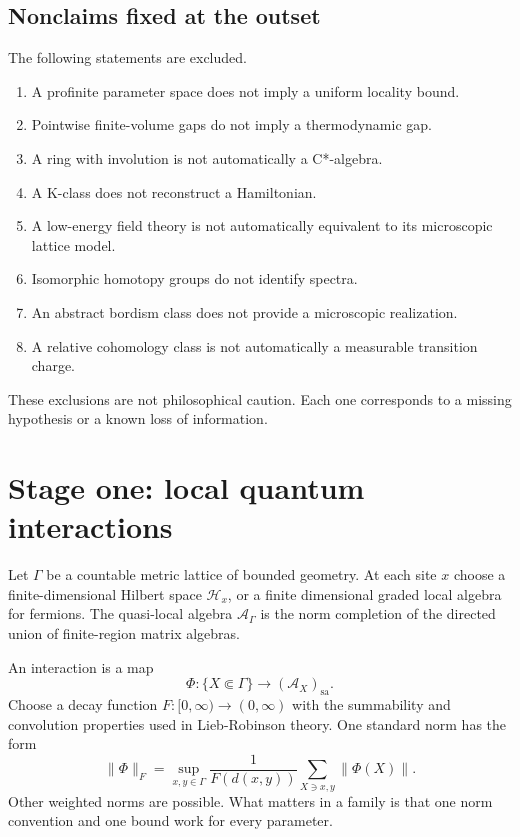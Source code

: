 \documentclass[12pt]{article}
\theoremstyle{definition}
\theoremstyle{remark}
\newcommand{\A}{\mathcal A}
\begin{document}
\subsection{Nonclaims fixed at the outset}

The following statements are excluded.
\begin{enumerate}[leftmargin=2.2em]
  \item A profinite parameter space does not imply a uniform locality bound.
  \item Pointwise finite-volume gaps do not imply a thermodynamic gap.
  \item A ring with involution is not automatically a C*-algebra.
  \item A K-class does not reconstruct a Hamiltonian.
  \item A low-energy field theory is not automatically equivalent to its
  microscopic lattice model.
  \item Isomorphic homotopy groups do not identify spectra.
  \item An abstract bordism class does not provide a microscopic realization.
  \item A relative cohomology class is not automatically a measurable
  transition charge.
\end{enumerate}

These exclusions are not philosophical caution.  Each one corresponds to a
missing hypothesis or a known loss of information.

\section{Stage one: local quantum interactions}

Let $\Gamma$ be a countable metric lattice of bounded geometry.  At each site
$x$ choose a finite-dimensional Hilbert space $\mathcal H_x$, or a finite
dimensional graded local algebra for fermions.  The quasi-local algebra
$\A_\Gamma$ is the norm completion of the directed union of finite-region
matrix algebras.

An interaction is a map
\begin{equation}
\Phi:\{X\Subset\Gamma\}\longrightarrow(\A_X)_{\mathrm{sa}}.
\end{equation}
Choose a decay function $F:[0,\infty)\to(0,\infty)$ with the summability and
convolution properties used in Lieb-Robinson theory.  One standard norm has
the form
\begin{equation}
\|\Phi\|_F
=
\sup_{x,y\in\Gamma}
\frac{1}{F(d(x,y))}
\sum_{X\ni x,y}\|\Phi(X)\|.
\label{eq:f-norm}
\end{equation}
Other weighted norms are possible.  What matters in a family is that one
norm convention and one bound work for every parameter.
\end{document}
